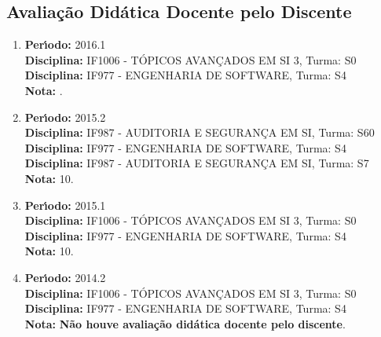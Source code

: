 \subsection{Avalia\c{c}\~{a}o Did\'{a}tica Docente pelo Discente}
\vspace{0.3cm}


\begin{enumerate}
\renewcommand{\labelenumi}{{\large\bfseries\arabic{enumi}.}}

\item   \textbf{Per\'{\i}odo:} 2016.1 \\
        \textbf{Disciplina:} IF1006 - T\'{O}PICOS AVAN\c{C}ADOS EM SI 3, Turma: S0\\
        \textbf{Disciplina:} IF977 - ENGENHARIA DE SOFTWARE, Turma: S4\\
        \textbf{Nota:} .

\item   \textbf{Per\'{\i}odo:} 2015.2 \\
        \textbf{Disciplina:} IF987 - AUDITORIA E SEGURAN\c{C}A EM SI, Turma: S60\\
        \textbf{Disciplina:} IF977 - ENGENHARIA DE SOFTWARE, Turma: S4\\
        \textbf{Disciplina:} IF987 - AUDITORIA E SEGURAN\c{C}A EM SI, Turma: S7\\
        \textbf{Nota:} 10.

\item   \textbf{Per\'{\i}odo:} 2015.1 \\
        \textbf{Disciplina:} IF1006 - T\'{O}PICOS AVAN\c{C}ADOS EM SI 3, Turma: S0\\
        \textbf{Disciplina:} IF977 - ENGENHARIA DE SOFTWARE, Turma: S4\\
        \textbf{Nota:} 10.

\item   \textbf{Per\'{\i}odo:} 2014.2 \\
        \textbf{Disciplina:} IF1006 - T\'{O}PICOS AVAN\c{C}ADOS EM SI 3, Turma: S0\\
        \textbf{Disciplina:} IF977 - ENGENHARIA DE SOFTWARE, Turma: S4\\
        \textbf{Nota:} \textbf{N\~{a}o houve avalia\c{c}\~{a}o did\'{a}tica docente pelo discente}.

\end{enumerate}